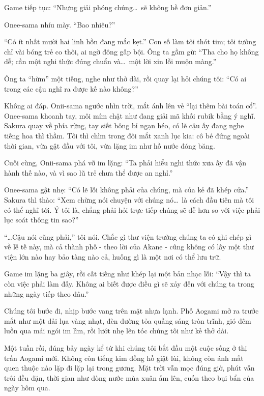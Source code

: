 \documentclass[../main.tex]{subfiles}
\begin{document}
Game tiếp tục: ``Nhưng giải phóng chúng\dots\ sẽ không hề đơn giản.''

Onee-sama nhíu mày. ``Bao nhiêu?''

``Có ít nhất mười hai linh hồn đang mắc kẹt.'' Con số làm tôi thót tim; tôi tưởng chỉ vài bóng trẻ co thôi, ai ngờ đông gấp bội. Ông ta gầm gừ: ``Tha cho họ không dễ; cần một nghi thức đúng chuẩn và\dots\ một lời xin lỗi muộn màng.''

Ông ta ``hừm'' một tiếng, nghe như thở dài, rồi quay lại hỏi chúng tôi: ``Có ai trong các cậu nghĩ ra được kế nào không?''

Không ai đáp. Onii-sama ngước nhìn trời, mắt ánh lên vẻ ``lại thêm bài toán cổ''. Onee-sama khoanh tay, môi mím chặt như đang giải mã khối rubik bằng ý nghĩ. Sakura quay về phía rừng, tay siết bông bỉ ngạn héo, có lẽ cậu ấy đang nghe tiếng hoa thì thầm. Tôi thì chìm trong đôi mắt xanh lục kia: cô bé đứng ngoài thời gian, vừa gật đầu với tôi, vừa lặng im như hồ nước đóng băng.

Cuối cùng, Onii-sama phá vỡ im lặng: ``Ta phải hiểu nghi thức xưa ấy đã vận hành thế nào, và vì sao lũ trẻ chưa thể được an nghỉ.''

Onee-sama gật nhẹ: ``Có lẽ lỗi không phải của chúng, mà của kẻ đã khép cửa.'' Sakura thì thào: ``Xem chừng nói chuyện với chúng nó\dots\ là cách đầu tiên mà tôi có thể nghĩ tới. Ý tôi là, chẳng phải hỏi trực tiếp chúng sẽ dễ hơn so với việc phải lục soát thông tin sao?''

``\dots Cậu nói cũng phải,'' tôi nói. Chắc gì thư viện trường chúng ta có ghi chép gì về lễ tế này, mà cả thành phố - theo lời của Akane - cũng không có lấy một thư viện lớn nào hay bảo tàng nào cả, huống gì là một nơi có thể lưu trữ.

Game im lặng ba giây, rồi cất tiếng như khép lại một bản nhạc lỗi: ``Vậy thì ta còn việc phải làm đấy. Không ai biết được điều gì sẽ xảy đến với chúng ta trong những ngày tiếp theo đâu.''

Chúng tôi bước đi, nhịp bước vang trên mặt nhựa lạnh. Phố Aogami mở ra trước mắt như một dải lụa vàng nhạt, đèn đường tỏa quầng sáng tròn trĩnh, gió đêm luồn qua mái ngói im lìm, rồi lướt nhẹ lên tóc chúng tôi như kẻ thở dài.

Một tuần rồi, đúng bảy ngày kể từ khi chúng tôi bắt đầu một cuộc sống ở thị trấn Aogami mới. Không còn tiếng kim đồng hồ giật lùi, không còn ánh mắt quen thuộc nào lặp đi lặp lại trong gương. Mặt trời vẫn mọc đúng giờ, phút vẫn trôi đều đặn, thời gian như dòng nước mùa xuân ấm lên, cuốn theo bụi bẩn của ngày hôm qua.
\end{document}

